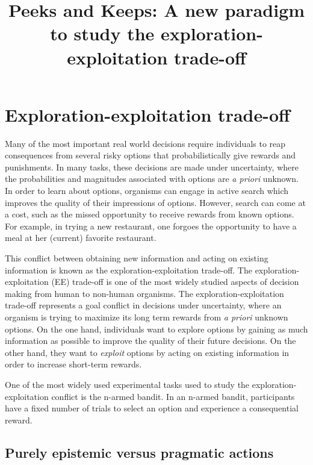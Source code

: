 \documentclass[a4paper,doc,natbib,floatsintext]{apa6}\usepackage[]{graphicx}\usepackage[]{color}
\title{Peeks and Keeps: A new paradigm to study the exploration-exploitation trade-off}
\begin{document}


\maketitle

\section{Exploration-exploitation trade-off}

Many of the most important real world decisions require individuals to reap consequences from several risky options that probabilistically give rewards and punishments. In many tasks, these decisions are made under uncertainty, where the probabilities and magnitudes associated with options are \textit{a priori} unknown. In order to learn about options, organisms can engage in active search which improves the quality of their impressions of options. However, search can come at a cost, such as the missed opportunity to receive rewards from known options. For example, in trying a new restaurant, one forgoes the opportunity to have a meal at her (current) favorite restaurant.

This conflict between obtaining new information and acting on existing information is known as the exploration-exploitation trade-off. The exploration-exploitation (EE) trade-off is one of the most widely studied aspects of decision making from human to non-human organisms. The exploration-exploitation trade-off represents a goal conflict in decisions under uncertainty, where an organism is trying to maximize its long term rewards from \textit{a priori} unknown options. On the one hand, individuals want to explore options by gaining as much information as possible to improve the quality of their future decisions. On the other hand, they want to \textit{exploit} options by acting on existing information in order to increase short-term rewards.

One of the most widely used experimental tasks used to study the exploration-exploitation conflict is the n-armed bandit. In an n-armed bandit, participants have a fixed number of trials to select an option and experience a consequential reward.



\subsection{Purely epistemic versus pragmatic actions}
\end{document}
